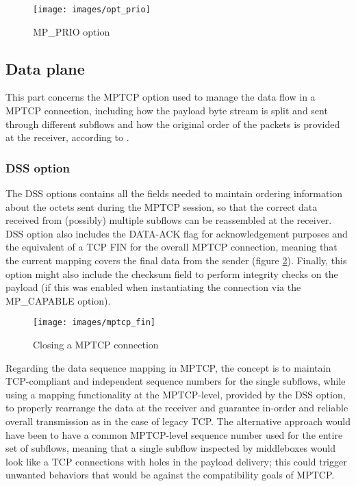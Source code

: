 \begin{figure}[!htb]
\centering
\texttt{[image: images/opt\_prio]}
\caption{MP\_PRIO option}
\label{fig:opt_prio}
\end{figure}

\subsection{Data plane}
\label{dataplane}
This part concerns the MPTCP option used to manage the data flow in a MPTCP connection, including how the payload byte stream is split and sent through different subflows and how the original order of the packets is provided at the receiver, according to .

\subsubsection{DSS option}
\label{dss}
The DSS options contains all the fields needed to maintain ordering information about the octets sent during the MPTCP session, so that the correct data received from (possibly) multiple subflows can be reassembled at the receiver. DSS option also includes the DATA-ACK flag for acknowledgement purposes and the equivalent of a TCP FIN for the overall MPTCP connection, meaning that the current mapping covers the final data from the sender (figure \ref{fig:mptcp_fin}). Finally, this option might also include the checksum field to perform integrity checks on the payload (if this was enabled when instantiating the connection via the MP\_CAPABLE option).

\begin{figure}[!htb]
\centering
\texttt{[image: images/mptcp\_fin]}
\caption{Closing a MPTCP connection}
\label{fig:mptcp_fin}
\end{figure}

Regarding the data sequence mapping in MPTCP, the concept is to maintain TCP-compliant and independent sequence numbers for the single subflows, while using a mapping functionality at the MPTCP-level, provided by the DSS option, to properly rearrange the data at the receiver and guarantee in-order and reliable overall transmission as in the case of legacy TCP. The alternative approach would have been to have a common MPTCP-level sequence number used for the entire set of subflows, meaning that a single subflow inspected by middleboxes would look like a TCP connections with holes in the payload delivery; this could trigger unwanted behaviors that would be against the compatibility goals of MPTCP.

